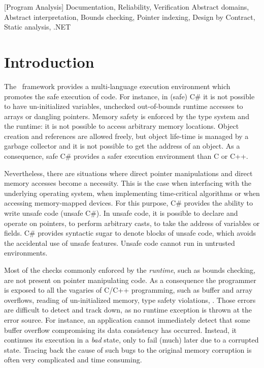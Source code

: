 \documentclass[10pt]{sigplanconf}
\begin{document}
[Program Analysis]
\terms
Documentation, Reliability, Verification
\keywords
Abstract domains, Abstract interpretation, Bounds checking, Pointer indexing, Design by Contract, Static analysis, .NET

\section{Introduction}

The \NET\ framework provides a multi-language execution environment which promotes the safe execution of code.
For instance, in (safe) C\# it is not possible to have un-initialized
variables, unchecked out-of-bounds runtime accesses to arrays or dangling pointers.
Memory safety is enforced by the type system and the runtime: it is not possible to access arbitrary memory locations.
Object creation and references are allowed freely, but object life-time is managed by a garbage collector and it is not possible to get the address of an object.
As a consequence, safe C\# provides a safer execution environment than C or C++.

Nevertheless, there are situations where direct pointer manipulations and direct memory accesses become a necessity.
This is the case when interfacing with the underlying operating system, when implementing time-critical algorithms or when accessing memory-mapped devices.
For this purpose, C\# provides the ability to write unsafe code (unsafe C\#).
In unsafe code, it is possible to declare and operate on pointers, to
perform arbitrary casts, to take the address of variables or fields.
C\# provides  syntactic sugar to denote blocks of unsafe code, which avoids the accidental use of unsafe features.
Unsafe code cannot run in untrusted environments.

Most of the checks commonly enforced by the \emph{runtime}, such as
bounds checking, are not present on pointer manipulating code.  As a
consequence the programmer is exposed to all the vagaries of C/C++
programming, such as buffer and array overflows, reading of
un-initialized memory, type safety violations, \etc.  Those errors are
difficult to detect and track down, as no runtime exception is thrown
at the error source.
For instance, an application cannot immediately detect that some
buffer overflow compromising its data consistency has occurred. Instead,
it continues its execution in a \emph{bad} state, only to fail (much)
later due to a corrupted state. Tracing back the cause of such bugs to the original
memory corruption is often very complicated and time consuming.
\end{document}
